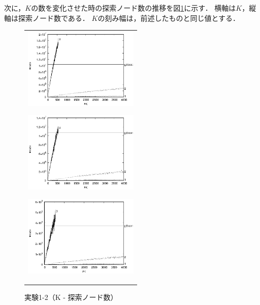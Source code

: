 次に，$K$の数を変化させた時の探索ノード数の推移を図\ref{1-2}に示す．
横軸は$K$，縦軸は探索ノード数である．
$K$の刻み幅は，前述したものと同じ値とする．
\begin{figure}[t]
	\begin{center}
		\begin{tabular}{c}
			\begin{minipage}{0.33\hsize}
				\begin{center}
					\includegraphics[width=55mm]{cpdb/node_1.eps}
				\end{center}
				\subcaption{$\nu = 0.1$}
				\label{fig:4}
			\end{minipage}
			\begin{minipage}{0.33\hsize}
				\begin{center}
					\includegraphics[width=55mm]{cpdb/node_3.eps}
				\end{center}
				\subcaption{$\nu = 0.3$}
				\label{fig:5}
			\end{minipage}
			\begin{minipage}{0.33\hsize}
				\begin{center}
					\includegraphics[width=55mm]{cpdb/node_5.eps}
				\end{center}
				\subcaption{$\nu = 0.5$}
				\label{fig:6}
			\end{minipage}
		\end{tabular}
		\caption{実験1-2（K - 探索ノード数）}
		\label{1-2}
	\end{center}
\end{figure}

